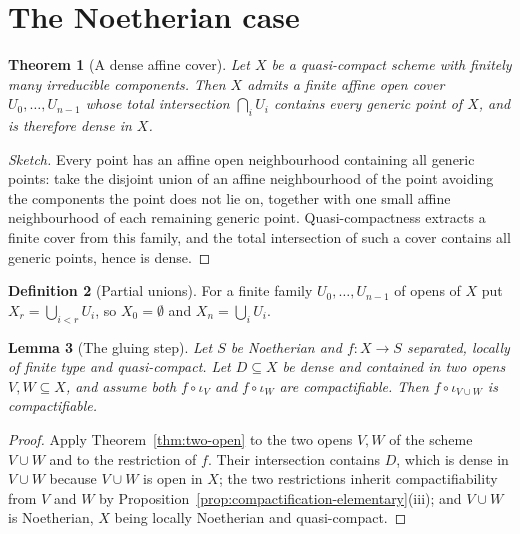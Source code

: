 \documentclass[11pt,a4paper]{article}
\theoremstyle{plain}
\newtheorem{theorem}{Theorem}[section]
\newtheorem{lemma}[theorem]{Lemma}
\theoremstyle{definition}
\newtheorem{definition}[theorem]{Definition}
\theoremstyle{remark}
\begin{document}
\section{The Noetherian case}
\label{sec:noetherian}

\begin{theorem}[A dense affine cover]
\label{thm:dense-affine-cover}
Let $X$ be a quasi-compact scheme with finitely many irreducible components.
Then $X$ admits a finite affine open cover $U_0,\dots,U_{n-1}$ whose total
intersection $\bigcap_i U_i$ contains every generic point of $X$, and is
therefore dense in $X$.
\end{theorem}

\begin{proof}[Sketch]
Every point has an affine open neighbourhood containing all generic points: take
the disjoint union of an affine neighbourhood of the point avoiding the
components the point does not lie on, together with one small affine
neighbourhood of each remaining generic point. Quasi-compactness extracts a
finite cover from this family, and the total intersection of such a cover
contains all generic points, hence is dense.
\end{proof}

\begin{definition}[Partial unions]
\label{def:partial-unions}
For a finite family $U_0,\dots,U_{n-1}$ of opens of $X$ put
$X_r=\bigcup_{i<r}U_i$, so $X_0=\emptyset$ and $X_n=\bigcup_i U_i$.
\end{definition}

\begin{lemma}[The gluing step]
\label{lem:gluing-step}
Let $S$ be Noetherian and $f\colon X\to S$ separated, locally of finite type
and quasi-compact. Let $D\subseteq X$ be dense and contained in two opens
$V,W\subseteq X$, and assume both $f\circ\iota_V$ and $f\circ\iota_W$ are
compactifiable. Then $f\circ\iota_{V\cup W}$ is compactifiable.
\end{lemma}

\begin{proof}
Apply Theorem~\ref{thm:two-open} to the two opens $V,W$ of the scheme $V\cup W$
and to the restriction of $f$. Their intersection contains $D$, which is dense
in $V\cup W$ because $V\cup W$ is open in $X$; the two restrictions inherit
compactifiability from $V$ and $W$ by
Proposition~\ref{prop:compactification-elementary}(iii); and $V\cup W$ is
Noetherian, $X$ being locally Noetherian and quasi-compact.
\end{proof}
\end{document}
